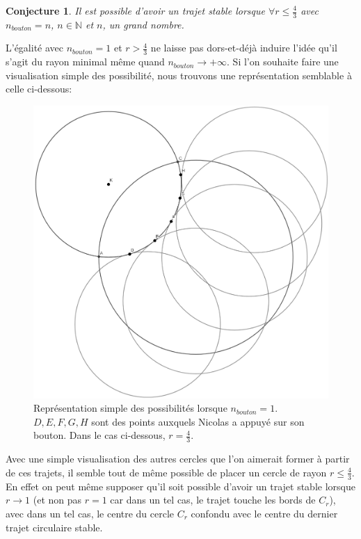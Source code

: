 \documentclass[a4paper]{amsart}
\newtheorem{conjecture}[theorem]{Conjecture}
\theoremstyle{definition}
\theoremstyle{remark}
\numberwithin{equation}{section}
\begin{document}
\begin{conjecture}
  Il est possible d'avoir un trajet stable lorsque $\forall r\leq\frac{4}{3}$ avec $n_{bouton}=n$, $n\in\mathbb{N}$ et $n$, un grand nombre.
\end{conjecture}

L'égalité avec $n_{bouton}=1$ et $r>\frac{4}{3}$ ne laisse pas dors-et-déjà induire l'idée qu'il s'agit du rayon minimal même quand $n_{bouton}\to +\infty$. Si l'on souhaite faire une visualisation simple des possibilité, nous trouvons une représentation semblable à celle ci-dessous:

\begin{figure}[H]
  \centering
  \includegraphics[scale=0.2]{images/conjecture.png}
  \caption{Représentation simple des possibilités lorsque $n_{bouton}=1$. $D,E,F,G,H$ sont des points auxquels Nicolas a appuyé sur son bouton. Dans le cas ci-dessous, $r=\frac{4}{3}$.}
\end{figure}

Avec une simple visualisation des autres cercles que l'on aimerait former à partir de ces trajets, il semble tout de même possible de placer un cercle de rayon $r\leq\frac{4}{3}$. En effet on peut même supposer qu'il soit possible d'avoir un trajet stable lorsque $r\to1$ (et non pas $r=1$ car dans un tel cas, le trajet touche les bords de $C_r$), avec dans un tel cas,
le centre du cercle $C_r$ confondu avec le centre du dernier trajet circulaire stable.
\end{document}
